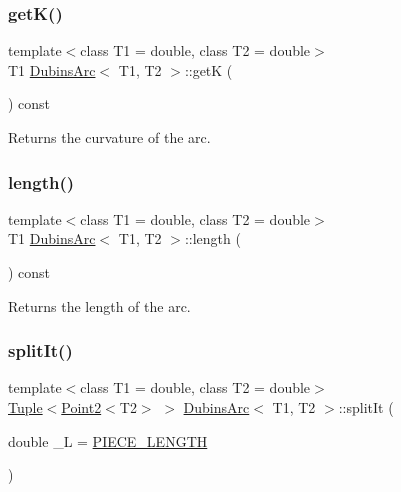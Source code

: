 \subsubsection{\texorpdfstring{getK()}{getK()}}
{\footnotesize\ttfamily template$<$class T1 = double, class T2 = double$>$ \\
T1 \mbox{\hyperlink{class_dubins_arc}{Dubins\+Arc}}$<$ T1, T2 $>$\+::getK (\begin{DoxyParamCaption}{ }\end{DoxyParamCaption}) const\hspace{0.3cm}{\ttfamily [inline]}}



Returns the curvature of the arc. 

\mbox{\label{class_dubins_arc_a1b0bfacb344d17377f4bda55fdaecae4}} 
\subsubsection{\texorpdfstring{length()}{length()}}
{\footnotesize\ttfamily template$<$class T1 = double, class T2 = double$>$ \\
T1 \mbox{\hyperlink{class_dubins_arc}{Dubins\+Arc}}$<$ T1, T2 $>$\+::length (\begin{DoxyParamCaption}{ }\end{DoxyParamCaption}) const\hspace{0.3cm}{\ttfamily [inline]}}



Returns the length of the arc. 

\mbox{\label{class_dubins_arc_a346c19e3e9f25747e3e3ae9de997e09d}} 
\subsubsection{\texorpdfstring{splitIt()}{splitIt()}}
{\footnotesize\ttfamily template$<$class T1 = double, class T2 = double$>$ \\
\mbox{\hyperlink{class_tuple}{Tuple}}$<$\mbox{\hyperlink{class_point2}{Point2}}$<$T2$>$ $>$ \mbox{\hyperlink{class_dubins_arc}{Dubins\+Arc}}$<$ T1, T2 $>$\+::split\+It (\begin{DoxyParamCaption}\item[{double}]{\+\_\+L = {\ttfamily \mbox{\hyperlink{dubins_8hh_a5b2500ca93a5100f73dc442d3cfea7d4}{P\+I\+E\+C\+E\+\_\+\+L\+E\+N\+G\+TH}}} }\end{DoxyParamCaption})\hspace{0.3cm}{\ttfamily [inline]}}



